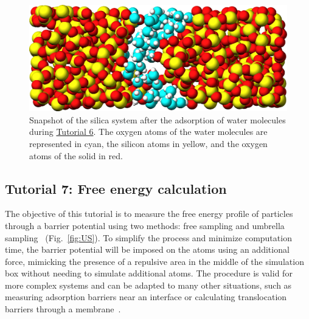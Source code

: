 \documentclass[9pt,tutorial]{livecoms}
\begin{document}
\begin{figure}
\centering
\includegraphics[width=\linewidth]{GCMC-solvated}
\caption{Snapshot of the silica system after the adsorption of water molecules
during \hyperref[gcmc-silica-label]{Tutorial 6}.
The oxygen atoms of the water molecules are represented in cyan, the silicon
atoms in yellow, and the oxygen atoms of the solid in red.}
\label{fig:GCMC-solvated}
\end{figure}

\subsection{Tutorial 7: Free energy calculation}
\label{umbrella-sampling-label}

The objective of this tutorial is to measure the free energy profile of
particles through a barrier potential using two methods: free sampling
and umbrella sampling~\cite{kastner2011umbrella, allen2017computer,
  frenkel2023understanding} (Fig.~\ref{fig:US}).  To simplify the
process and minimize computation time, the barrier potential will be
imposed on the atoms using an additional force, mimicking the presence
of a repulsive area in the middle of the simulation box without needing
to simulate additional atoms.  The procedure is valid for more complex
systems and can be adapted to many other situations, such as measuring
adsorption barriers near an interface or calculating translocation
barriers through a membrane~\cite{wilson1997adsorption,
  makarov2009computer, gravelle2021adsorption, loche2022molecular,
  hayatifar2024probing}.
\end{document}
